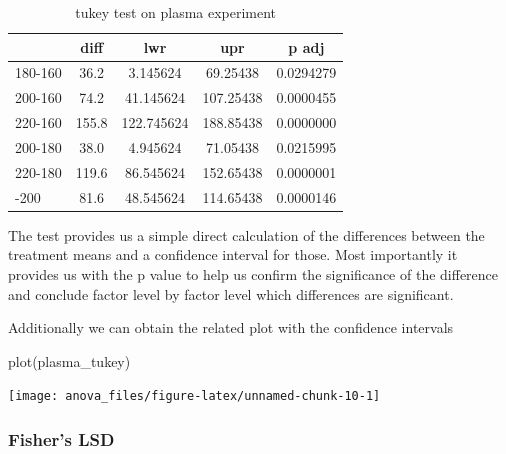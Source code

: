 \documentclass[
]{book}
\newenvironment{Shaded}{\begin{snugshade}}{\end{snugshade}}
\newcommand{\AttributeTok}[1]{\textcolor[rgb]{0.77,0.63,0.00}{#1}}
\newcommand{\FunctionTok}[1]{\textcolor[rgb]{0.00,0.00,0.00}{#1}}
\newcommand{\NormalTok}[1]{#1}
\newcommand{\SpecialCharTok}[1]{\textcolor[rgb]{0.00,0.00,0.00}{#1}}
\newcommand{\StringTok}[1]{\textcolor[rgb]{0.31,0.60,0.02}{#1}}
\begin{document}
\begin{Shaded}
\end{Shaded}

\begin{table}

\caption{\label{tab:tab-plasmatukey}tukey test on plasma experiment}
\centering
\begin{tabular}[t]{lcccc}
\toprule
  & diff & lwr & upr & p adj\\
\midrule
180-160 & 36.2 & 3.145624 & 69.25438 & 0.0294279\\
200-160 & 74.2 & 41.145624 & 107.25438 & 0.0000455\\
220-160 & 155.8 & 122.745624 & 188.85438 & 0.0000000\\
200-180 & 38.0 & 4.945624 & 71.05438 & 0.0215995\\
220-180 & 119.6 & 86.545624 & 152.65438 & 0.0000001\\
\addlinespace
220-200 & 81.6 & 48.545624 & 114.65438 & 0.0000146\\
\bottomrule
\end{tabular}
\end{table}

The test provides us a simple direct calculation of the differences between the treatment means and a confidence interval for those. Most importantly it provides us with the p value to help us confirm the significance of the difference and conclude factor level by factor level which differences are significant.

Additionally we can obtain the related plot with the confidence intervals

\begin{Shaded}
\begin{Highlighting}[]
\FunctionTok{plot}\NormalTok{(plasma\_tukey)}
\end{Highlighting}
\end{Shaded}

\texttt{[image: anova\_files/figure-latex/unnamed-chunk-10-1]}

\hypertarget{fisherLSD}{%
\subsubsection{Fisher's LSD}\label{fisherLSD}}
\end{document}
